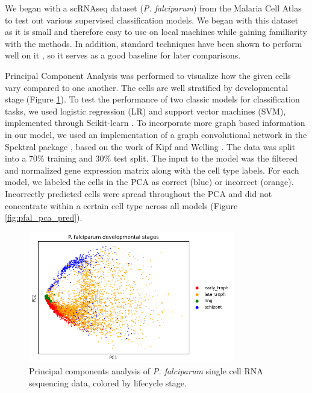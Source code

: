 \documentclass{article}
\begin{document}
We began with a scRNAseq dataset (\emph{P. falciparum}) from the Malaria Cell Atlas \cite{howickMalariaCellAtlas2019} to test out various supervised classification models. We began with this dataset as it is small and therefore easy to use on local machines while gaining familiarity with the methods. In addition, standard techniques have been shown to perform well on it \cite{shuklaSupervisedLearningPlasmodium2023}, so it serves as a good baseline for later comparisons. 

Principal Component Analysis was performed to visualize how the given cells vary compared to one another. The cells are well stratified by developmental stage (Figure \ref{fig:pfal_pca_true}). To test the performance of two classic models for classification tasks, we used logistic regression (LR) and support vector machines (SVM), implemented through Scikit-learn \cite{pedregosaScikitlearnMachineLearning2011}. To incorporate more graph based information in our model, we used an implementation of a graph convolutional network in the Spektral package \cite{grattarolaGraphNeuralNetworks2020}, based on the work of Kipf and Welling \cite{kipfSemiSupervisedClassificationGraph2017}. The data was split into a 70\% training and 30\% test split. The input to the model was the filtered and normalized gene expression matrix along with the cell type labels. For each model, we labeled the cells in the PCA as correct (blue) or incorrect (orange). Incorrectly predicted cells were spread throughout the PCA and did not concentrate within a certain cell type across all models (Figure \ref{fig:pfal_pca_pred}). 

\begin{figure}[H]
	\centering
  \includegraphics[width=0.8\textwidth]{figures/pca_Pf.png}
  \caption{Principal components analysis of \textit{P. falciparum} single cell RNA sequencing data, colored by lifecycle stage.}
  \label{fig:pfal_pca_true}
\end{figure}
\end{document}
